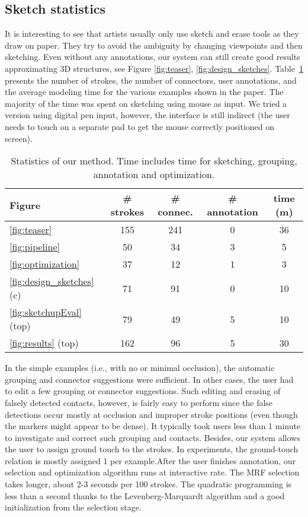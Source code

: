{\subsection{Sketch statistics} It is interesting to see that artists usually only use sketch and erase tools as they draw on paper. They try to avoid the ambiguity by changing viewpoints and then sketching. Even without any annotations, our system can still create good results approximating 3D structures, see Figure \ref{fig:teaser}, \ref{fig:design_sketches}. Table~\ref{tbl:statistics} presents the number of strokes, the number of connectors, user annotations, and the average modeling time for the various examples shown in the paper. The majority of the time was spent on sketching using mouse as input. We tried a version using digital pen input, however, the interface is still indirect (the user needs to touch on a separate pad to get the mouse correctly positioned on screen).


\begin{table} \vnudge\centering
\small
\caption{Statistics of our method. %
Time includes time for sketching, grouping, annotation and optimization.
} \label{tbl:statistics}
\begin{tabular}{l|c|c|c|c}
\hline
  Figure & \# strokes & \# connec. & \# annotation & time (m) \\
  \hline
\ref{fig:teaser} & 155 & 241 & 0 & 36 \\
\ref{fig:pipeline} & 50 & 34 & 3 &  5 \\
\ref{fig:optimization} &  37 & 12 & 1 & 3\\
\ref{fig:design_sketches} (c) & 71 & 91 & 0 & 10 \\
\ref{fig:sketchupEval} (top) & 79 & 49 & 5 & 10 \\
\ref{fig:results} (top) &  162 & 96  & 5 & 30\\
\hline
\end{tabular}
\end{table}


In the simple examples (i.e., with no or minimal occlusion), the automatic grouping and connector suggestions were sufficient. In other cases, the user had to edit a few grouping or connector suggestions. Such editing and erasing of falsely detected contacts, however, is fairly easy to perform since the false detections occur mostly at occlusion and improper stroke positions (even though the markers might appear to be dense). It typically took users less than 1 minute to investigate and correct such grouping and contacts. Besides, our system allows the user to assign ground touch to the strokes. In experiments, the ground-touch relation is mostly assigned 1 per example.After the user finishes annotation, our selection and optimization algorithm runs at interactive rate. The MRF selection takes longer, about 2-3 seconds per 100 strokes. The quadratic programming is less than a second thanks to the Levenberg-Marquardt algorithm and a good initialization from the selection stage.

}
